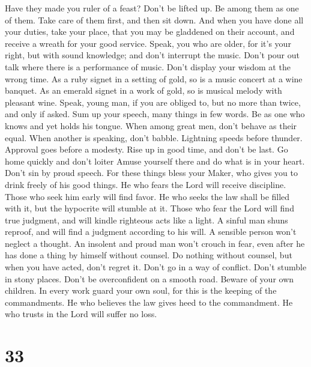  Have they made you ruler of a feast? Don't be lifted up.
Be among them as one of them. Take care of them first, and then sit
down.  And when you have done all your duties, take your
place, that you may be gladdened on their account, and receive a wreath
for your good service.  Speak, you who are older, for it's
your right, but with sound knowledge; and don't interrupt the music.
 Don't pour out talk where there is a performance of
music. Don't display your wisdom at the wrong time.  As a
ruby signet in a setting of gold, so is a music concert at a wine
banquet.  As an emerald signet in a work of gold, so is
musical melody with pleasant wine.  Speak, young man, if
you are obliged to, but no more than twice, and only if asked.
 Sum up your speech, many things in few words. Be as one
who knows and yet holds his tongue.  When among great men,
don't behave as their equal. When another is speaking, don't babble.
 Lightning speeds before thunder. Approval goes before a
modesty.  Rise up in good time, and don't be last. Go
home quickly and don't loiter  Amuse yourself there and
do what is in your heart. Don't sin by proud speech.  For
these things bless your Maker, who gives you to drink freely of his good
things.  He who fears the Lord will receive discipline.
Those who seek him early will find favor.  He who seeks
the law shall be filled with it, but the hypocrite will stumble at it.
 Those who fear the Lord will find true judgment, and
will kindle righteous acts like a light.  A sinful man
shuns reproof, and will find a judgment according to his will.
 A sensible person won't neglect a thought. An insolent
and proud man won't crouch in fear, even after he has done a thing by
himself without counsel.  Do nothing without counsel, but
when you have acted, don't regret it.  Don't go in a way
of conflict. Don't stumble in stony places.  Don't be
overconfident on a smooth road.  Beware of your own
children.  In every work guard your own soul, for this is
the keeping of the commandments.  He who believes the law
gives heed to the commandment. He who trusts in the Lord will suffer no
loss.

\hypertarget{section-28}{%
\section{33}\label{section-28}}

